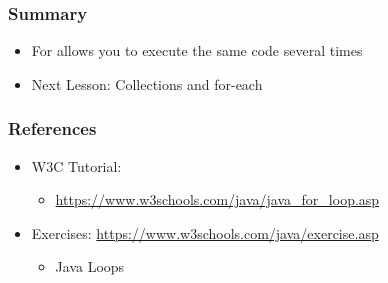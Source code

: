 \documentclass{beamer}
\begin{document}
	\begin{frame}
		\frametitle{Summary}
		\begin{itemize}
			\item For allows you to execute the same code several times
			\item Next Lesson: Collections and for-each
		\end{itemize}
	\end{frame}

	\begin{frame}
		\frametitle{References}
		\begin{itemize}
			\item W3C Tutorial: 
			\begin{itemize}
				\item \url{https://www.w3schools.com/java/java_for_loop.asp}
			\end{itemize}
			\item Exercises: \url{https://www.w3schools.com/java/exercise.asp}
			\begin{itemize}
				\item Java Loops
			\end{itemize}
		\end{itemize}
		
	\end{frame}
\end{document}
